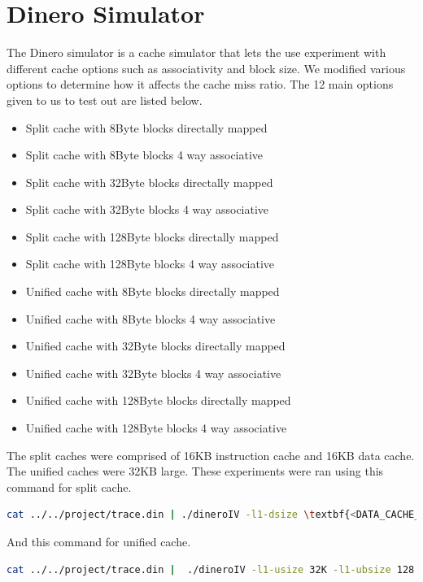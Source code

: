 \documentclass{article}
\begin{document}
	\section{Dinero Simulator}
		The Dinero simulator is a cache simulator that lets the use experiment with different cache options such as associativity and block size. We modified various options to determine how it affects the cache miss ratio. The 12 main options given to us to test out are listed below. 
		\begin{itemize}
			\item Split cache with 8Byte blocks directally mapped
			\item Split cache with 8Byte blocks 4 way associative
			\item Split cache with 32Byte blocks directally mapped
			\item Split cache with 32Byte blocks 4 way associative
			\item Split cache with 128Byte blocks directally mapped
			\item Split cache with 128Byte blocks 4 way associative
			\item Unified cache with 8Byte blocks directally mapped
			\item Unified cache with 8Byte blocks 4 way associative
			\item Unified cache with 32Byte blocks directally mapped
			\item Unified cache with 32Byte blocks 4 way associative
			\item Unified cache with 128Byte blocks directally mapped
			\item Unified cache with 128Byte blocks 4 way associative
		\end{itemize}
		The split caches were comprised of 16KB instruction cache and 16KB data cache. The unified caches were 32KB large. These experiments were ran using this command for split cache.
		\begin{lstlisting}[language=bash]
			cat ../../project/trace.din | ./dineroIV -l1-dsize \textbf{<DATA_CACHE_SIZE>} -l1-dbsize \textbf{<DATA_BLOCK_SIZE>} -l1-dassoc \textbf{<DATA_ASSOC>} -l1-isize \textbf{<INS_CACHE_SIZE>} -l1-ibsize \textbf{<INS_BLOCK_SIZE>} -l1-iassoc \textbf{<INS_ASSOC>} -informatd
		\end{lstlisting}
		And this command for unified cache.
		\begin{lstlisting}[language=bash]
			cat ../../project/trace.din |  ./dineroIV -l1-usize 32K -l1-ubsize 128 -l1-uassoc 1 -informatd
		\end{lstlisting}
\end{document}
